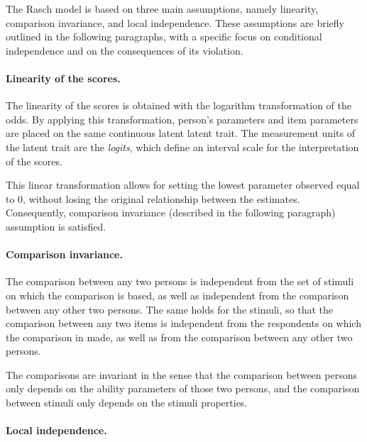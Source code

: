 \documentclass[12pt]{book}
\begin{document}
The Rasch model is based on three main assumptions, namely linearity, comparison invariance, and local independence. These assumptions are briefly outlined in the following paragraphs, with a specific focus on conditional independence and on the consequences of its violation. 

\paragraph{Linearity of the scores.}
The linearity of the scores is obtained with the logarithm transformation of the odds. By applying this transformation, person’s parameters and item parameters are placed on the same continuous latent latent trait. The measurement units of the latent trait are the \emph{logits}, which define an interval scale for the interpretation of the scores.

This linear transformation allows for setting the lowest parameter observed equal to 0, without losing the original relationship between the estimates. Consequently, comparison invariance (described in the following paragraph) assumption is satisfied.

\paragraph{Comparison invariance.}
The comparison between any two persons is independent from the set of stimuli on which the comparison is based, as well as independent from the comparison between any other two persons. 
The same holds for the stimuli, so that the comparison between any two items is independent from the respondents on which the comparison in made, as well as from the comparison between any other two persons.

The comparisons are invariant in the sense that the comparison between persons only depends on the ability parameters of those two persons, and the comparison between stimuli only depends on the stimuli properties. 


\paragraph{Local independence.}\label{par:local}
\end{document}
